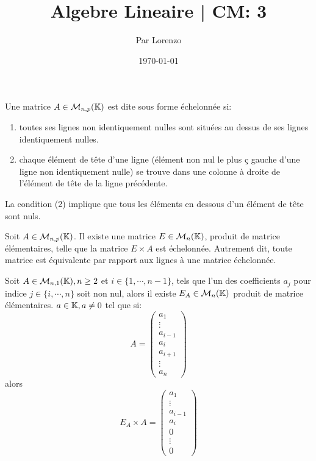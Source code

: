 \documentclass[a4paper, 12pt]{article}
\title{Algebre Lineaire | CM: 3}
\author{Par Lorenzo}
\date{\today}
\begin{document}
\maketitle

\begin{definition}
    Une matrice $A \in \mathcal{M}_{n,p}(\mathbb{K})$ est dite sous forme échelonnée si:
    \begin{enumerate}
        \item toutes ses lignes non identiquement nulles sont situées au dessus de ses lignes identiquement nulles.
        \item chaque élément de tête d'une ligne (élément non nul le plus ç gauche d'une ligne non identiquement nulle) se trouve dans une colonne à droite de l'élément de tête de la ligne précédente.
    \end{enumerate}
\end{definition}

\begin{remark}
    La condition (2) implique que tous les éléments en dessous d'un élément de tête sont nuls.
\end{remark}

\begin{definition}
    Soit $A \in \mathcal{M}_{n,p}(\mathbb{K})$. Il existe une matrice $E \in \mathcal{M}_{n}(\mathbb{K})$, produit de matrice élémentaires, telle que la matrice $E \times A$ est échelonnée.
    Autrement dit, toute matrice est équivalente par rapport aux lignes à une matrice échelonnée.
\end{definition}

\begin{lemme}
    Soit $A \in \mathcal{M}_{n,1}(\mathbb{K}), n \geq 2$ et $i \in \{1, \cdots, n-1\}$, tels que l'un des coefficients $a_j$ pour indice $j \in \{i, \cdots, n\}$ soit non nul, alors
    il existe $E_A \in \mathcal{M}_n(\mathbb{K})$ produit de matrice élémentaires.
    $a \in \mathbb{K}, a \neq 0$ tel que si:
    $$
    A = \left(
        \begin{array}{c}
            a_1 \\
            \vdots \\
            a_{i-1} \\
            a_i \\
            a_{i+1} \\
            \vdots \\
            a_n
        \end{array}
    \right)
    $$
    alors 
    $$
    E_A \times A = \left(
        \begin{array}{c}
            a_1 \\
            \vdots \\
            a_{i-1} \\
            a_i \\
            0 \\
            \vdots \\
            0
        \end{array}
    \right)
    $$

\end{lemme}
\end{document}
